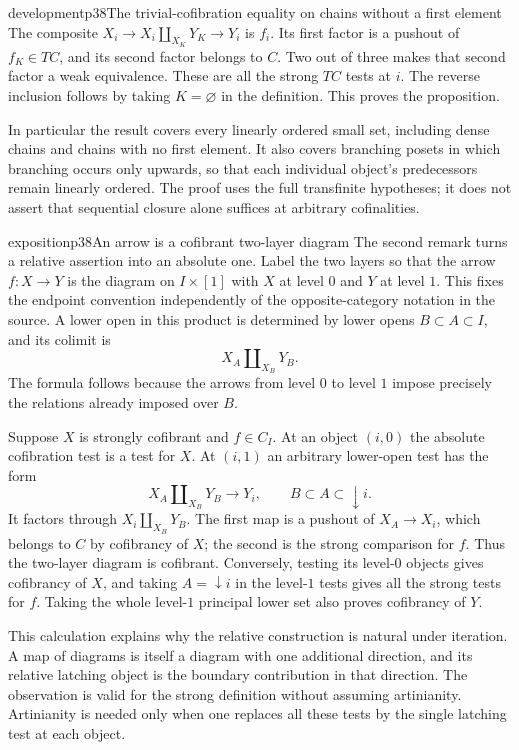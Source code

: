 \begin{dcomment}{development}{p38}{The trivial-cofibration equality on chains without a first element}
The composite $X_i\to X_i\amalg_{X_K}Y_K\to Y_i$ is $f_i$. Its first factor is a pushout of $f_K\in TC$, and its second factor belongs to $C$. Two out of three makes that second factor a weak equivalence. These are all the strong $TC$ tests at $i$. The reverse inclusion follows by taking $K=\varnothing$ in the definition. This proves the proposition.

In particular the result covers every linearly ordered small set, including dense chains and chains with no first element. It also covers branching posets in which branching occurs only upwards, so that each individual object's predecessors remain linearly ordered. The proof uses the full transfinite hypotheses; it does not assert that sequential closure alone suffices at arbitrary cofinalities.
\end{dcomment}


\begin{dcomment}{exposition}{p38}{An arrow is a cofibrant two-layer diagram}
The second remark turns a relative assertion into an absolute one. Label the two layers so that the arrow $f:X\to Y$ is the diagram on $I\times[1]$ with $X$ at level $0$ and $Y$ at level $1$. This fixes the endpoint convention independently of the opposite-category notation in the source. A lower open in this product is determined by lower opens $B\subset A\subset I$, and its colimit is
\[
 X_A\amalg_{X_B}Y_B.
\]
The formula follows because the arrows from level $0$ to level $1$ impose precisely the relations already imposed over $B$.

Suppose $X$ is strongly cofibrant and $f\in C_I$. At an object $(i,0)$ the absolute cofibration test is a test for $X$. At $(i,1)$ an arbitrary lower-open test has the form
\[
 X_A\amalg_{X_B}Y_B\longrightarrow Y_i,
 \qquad B\subset A\subset\downarrow i.
\]
It factors through $X_i\amalg_{X_B}Y_B$. The first map is a pushout of $X_A\to X_i$, which belongs to $C$ by cofibrancy of $X$; the second is the strong comparison for $f$. Thus the two-layer diagram is cofibrant. Conversely, testing its level-$0$ objects gives cofibrancy of $X$, and taking $A=\downarrow i$ in the level-$1$ tests gives all the strong tests for $f$. Taking the whole level-$1$ principal lower set also proves cofibrancy of $Y$.

This calculation explains why the relative construction is natural under iteration. A map of diagrams is itself a diagram with one additional direction, and its relative latching object is the boundary contribution in that direction. The observation is valid for the strong definition without assuming artinianity. Artinianity is needed only when one replaces all these tests by the single latching test at each object.
\end{dcomment}


